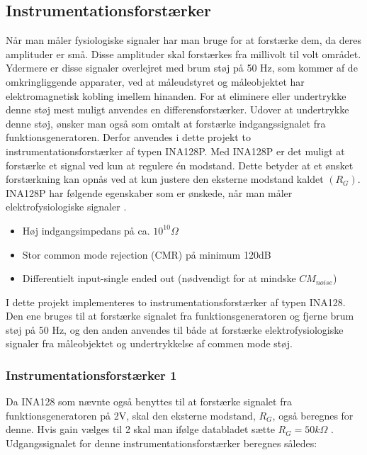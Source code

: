  \pagebreak

\subsection{Instrumentationsforstærker}
Når man måler fysiologiske signaler har man bruge for at forstærke dem, da deres amplituder er små. Disse amplituder skal forstærkes fra millivolt  til volt området. Ydermere er disse signaler overlejret med brum støj på 50 Hz, som kommer af de omkringliggende apparater, ved at måleudstyret og måleobjektet har elektromagnetisk kobling imellem hinanden. For at eliminere eller undertrykke denne støj mest muligt anvendes en differensforstærker. Udover at undertrykke denne støj, ønsker man også som omtalt at forstærke indgangssignalet fra funktionsgeneratoren. Derfor anvendes i dette projekt to instrumentationsforstærker af typen INA128P. Med INA128P er det muligt at forstærke et signal ved kun at regulere én modstand. Dette betyder at et ønsket forstærkning kan opnås ved at kun justere den eksterne modstand kaldet $(R_G)$. INA128P har følgende egenskaber som er ønskede, når man måler elektrofysiologiske signaler \cite{PeterJohansen2014}. 

\begin{itemize}
\item 	Høj indgangsimpedans på ca. $10^{10} \Omega $
\item	Stor common mode rejection (CMR) på minimum 120dB
\item 	Differentielt input-single ended out (nødvendigt for at mindske $CM_{noise}$)
\end{itemize}

I dette projekt implementeres to instrumentationsforstærker af typen INA128. Den ene bruges til at forstærke signalet fra funktionsgeneratoren og fjerne brum støj på 50 Hz, og den anden anvendes til både at forstærke elektrofysiologiske signaler fra måleobjektet og undertrykkelse af commen mode støj.


\subsubsection{Instrumentationsforstærker  1}

Da INA128 som nævnte også benyttes til at forstærke signalet fra funktionsgeneratoren på 2V, skal den eksterne modstand, $R_G$, også beregnes for denne. Hvis gain vælges til 2 skal man ifølge databladet  sætte $R_G=50k\Omega$  \citep [s.13]{TexasInstruments2005}. 
Udgangssignalet for denne instrumentationsforstærker beregnes således: 

